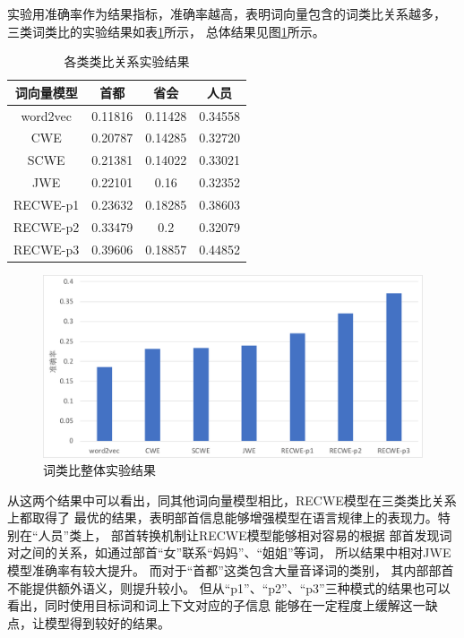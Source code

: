 实验用准确率作为结果指标，准确率越高，表明词向量包含的词类比关系越多，
三类词类比的实验结果如表\ref{word_analogy_resutl}所示，
总体结果见图\ref{word_analogy_all_resutl}所示。
\begin{table}[ht]
    \caption{各类类比关系实验结果}
    \begin{tabular}{|c|c|c|c|}
        \hline
        词向量模型 & 首都 & 省会 & 人员 \\
        \hline
        word2vec & 0.11816 & 0.11428 & 0.34558 \\
        \hline
        CWE & 0.20787 & 0.14285 & 0.32720 \\
        \hline
        SCWE & 0.21381 & 0.14022 & 0.33021 \\
        \hline
        JWE & 0.22101 & 0.16 & 0.32352 \\
        \hline
        RECWE-p1 & 0.23632 & 0.18285 & 0.38603 \\
        \hline
        RECWE-p2 & 0.33479 & 0.2 & 0.32079 \\
        \hline
        RECWE-p3 & 0.39606 & 0.18857 & 0.44852 \\
        \hline
    \end{tabular}
    \label{word_analogy_resutl}
    \end{table}

\begin{figure}[!h]
    \includegraphics[scale=0.45]{picture/word_analogy_result.pdf}
    \caption{词类比整体实验结果}
    \label{word_analogy_all_resutl}
\end{figure}

从这两个结果中可以看出，同其他词向量模型相比，RECWE模型在三类类比关系上都取得了
最优的结果，表明部首信息能够增强模型在语言规律上的表现力。特别在“人员”类上，
部首转换机制让RECWE模型能够相对容易的根据
部首发现词对之间的关系，如通过部首“女”联系“妈妈”、“姐姐”等词，
所以结果中相对JWE模型准确率有较大提升。
而对于“首都”这类包含大量音译词的类别，
其内部部首不能提供额外语义，则提升较小。
但从“p1”、“p2”、“p3”三种模式的结果也可以看出，同时使用目标词和词上下文对应的子信息
能够在一定程度上缓解这一缺点，让模型得到较好的结果。

